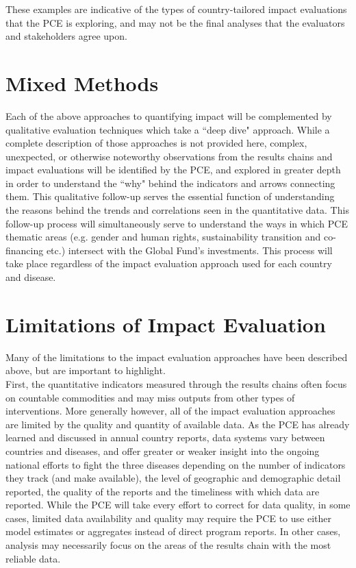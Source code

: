 \documentclass[twocolumn]{bmcart}%
\begin{document}
These examples are indicative of the types of country-tailored impact evaluations that the PCE is exploring, and may not be the final analyses that the evaluators and stakeholders agree upon. \\

\section{Mixed Methods}

Each of the above approaches to quantifying impact will be complemented by qualitative evaluation techniques which take a ``deep dive" approach. While a complete description of those approaches is not provided here, complex, unexpected, or otherwise noteworthy observations from the results chains and impact evaluations will be identified by the PCE, and explored in greater depth in order to understand the ``why" behind the indicators and arrows connecting them. This qualitative follow-up serves the essential function of understanding the reasons behind the trends and correlations seen in the quantitative data. This follow-up process will simultaneously serve to understand the ways in which PCE thematic areas (e.g. gender and human rights, sustainability transition and co-financing etc.) intersect with the Global Fund's investments. This process will take place regardless of the impact evaluation approach used for each country and disease. \\

\section{Limitations of Impact Evaluation}
Many of the limitations to the impact evaluation approaches have been described above, but are important to highlight. \\

First, the quantitative indicators measured through the results chains often focus on countable commodities and may miss outputs from other types of interventions. More generally however, all of the impact evaluation approaches are limited by the quality and quantity of available data. As the PCE has already learned and discussed in annual country reports, data systems vary between countries and diseases, and offer greater or weaker insight into the ongoing national efforts to fight the three diseases depending on the number of indicators they track (and make available), the level of geographic and demographic detail reported, the quality of the reports and the timeliness with which data are reported. While the PCE will take every effort to correct for data quality, in some cases, limited data availability and quality may require the PCE to use either model estimates or aggregates instead of direct program reports. In other cases, analysis may necessarily focus on the areas of the results chain with the most reliable data. \\
\end{document}
